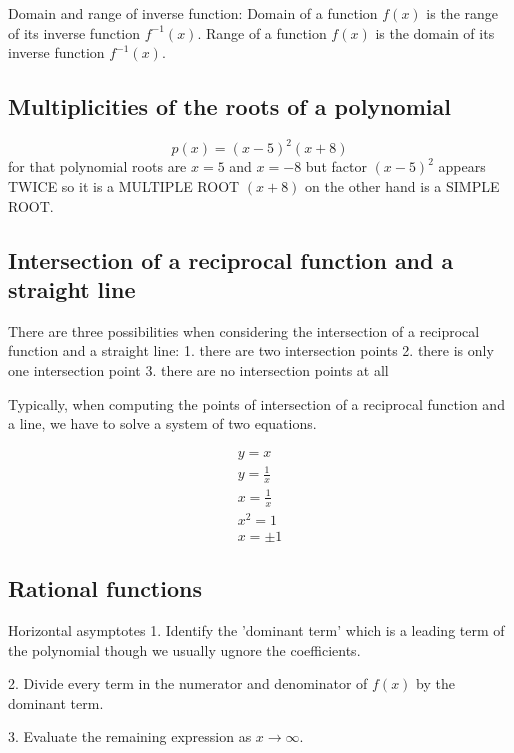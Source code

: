 \documentclass{article}
\begin{document}
Domain and range of inverse function:
Domain of a function $f(x)$ is the range of its inverse function $f^{-1}(x)$.
Range of a function $f(x)$ is the domain of its inverse function $f^{-1}(x)$.

\subsection{Multiplicities of the roots of a polynomial}
\begin{equation}
  p(x) = (x-5)^2(x+8)
\end{equation}
for that polynomial roots are $x=5$ and $x=-8$ but factor $(x-5)^2$
appears TWICE so it is a MULTIPLE ROOT
$(x+8)$ on the other hand is a SIMPLE ROOT.

\subsection{Intersection of a reciprocal function and a straight line}
There are three possibilities when considering the intersection of a reciprocal
function and a straight line:
1. there are two intersection points
2. there is only one intersection point
3. there are no intersection points at all


Typically, when computing the points of intersection of a reciprocal
function and a line, we have to solve a system of two equations.

\begin{equation}
  \begin{gathered}
    y = x \\
    y = \frac{1}{x} \\
    x = \frac{1}{x} \\
    x^2 = 1 \\
    x = \pm 1
  \end{gathered}
\end{equation}

\subsection{Rational functions}
Horizontal asymptotes
1. Identify the 'dominant term' which is a leading term of the polynomial though we
usually ugnore the coefficients.

2. Divide every term in the numerator and denominator of $f(x)$ by the dominant term.

3. Evaluate the remaining expression as $x \to \infty$.
\end{document}
